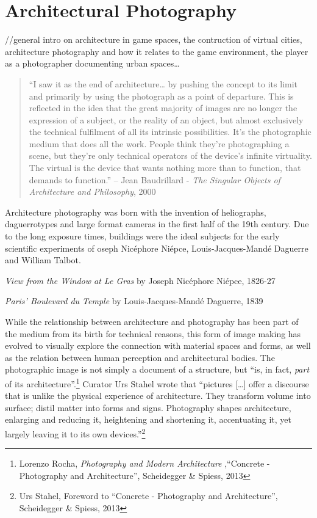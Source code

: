 \documentclass[
  openany]{book}
\begin{document}
\hypertarget{architectural-photography}{%
\chapter{Architectural Photography}\label{architectural-photography}}

//general intro on architecture in game spaces, the contruction of virtual cities, architecture photography and how it relates to the game environment, the player as a photographer documenting urban spaces\ldots{}

\begin{quote}
``I saw it as the end of architecture\ldots{} by pushing the concept to its limit and primarily by using the photograph as a point of departure. This is reflected in the idea that the great majority of images are no longer the expression of a subject, or the reality of an object, but almost exclusively the technical fulfilment of all its intrinsic possibilities. It's the photographic medium that does all the work. People think they're photographing a scene, but they're only technical operators of the device's infinite virtuality. The virtual is the device that wants nothing more than to function, that demands to function.''
-- Jean Baudrillard - \emph{The Singular Objects of Architecture and Philosophy}, 2000
\end{quote}

Architecture photography was born with the invention of heliographs, daguerrotypes and large format cameras in the first half of the 19th century. Due to the long exposure times, buildings were the ideal subjects for the early scientific experiments of oseph Nicéphore Niépce, Louis-Jacques-Mandé Daguerre and William Talbot.

\emph{View from the Window at Le Gras} by Joseph Nicéphore Niépce, 1826-27

\emph{Paris' Boulevard du Temple} by Louis-Jacques-Mandé Daguerre, 1839

While the relationship between architecture and photography has been part of the medium from its birth for technical reasons, this form of image making has evolved to visually explore the connection with material spaces and forms, as well as the relation between human perception and architectural bodies. The photographic image is not simply a document of a structure, but ``is, in fact, \emph{part} of its architecture''.\footnote{Lorenzo Rocha, \emph{Photography and Modern Architecture} ,``Concrete - Photography and Architecture'', Scheidegger \& Spiess, 2013} Curator Urs Stahel wrote that ``pictures {[}\ldots{]} offer a discourse that is unlike the physical experience of architecture. They transform volume into surface; distil matter into forms and signs. Photography shapes architecture, enlarging and reducing it, heightening and shortening it, accentuating it, yet largely leaving it to its own devices.''\footnote{Urs Stahel, Foreword to ``Concrete - Photography and Architecture'', Scheidegger \& Spiess, 2013}
\end{document}
